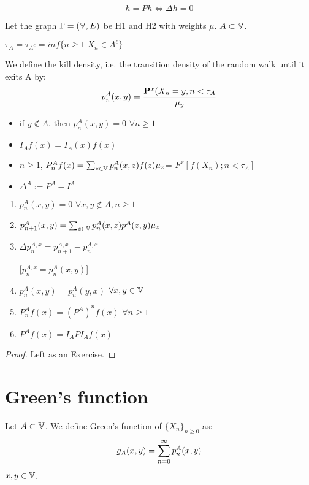 \documentclass[main]{subfiles}
\begin{document}
$$h=Ph \Leftrightarrow \Delta h=0$$

Let the graph $\Gamma=(\V,E)$ be H1 and H2 with weights $\mu$. $A \subset \V$.

$\tau_A=\tau_{A^c}=inf\{n \geq 1 | X_n \in A^c\}$

We define the kill density, i.e. the transition density of the random walk until it exits A by: $$p_n^A(x,y)=\frac{\P^x(X_n=y, n<\tau_A}{\mu_y}$$

\begin{itemize}
     \item
           if $y \notin A$, then $p_n^A(x,y)=0$ $\forall n \geq 1$
     \item
           $I_Af(x)=I_A(x)f(x)$
     \item
           $n\geq 1$, $P_n^Af(x)=\sum_{z \in \V} p_n^A(x,z)f(z)\mu_z$= $F^x[f(X_n); n<\tau_A]$
     \item
           $\Delta^A:= P^A-I^A$
\end{itemize}
\begin{lemma}
     \begin{enumerate}[label=(\alph*)]
          \item $p_n^A(x,y)=0$  $\forall x,y \notin A, n \geq 1$ \\
                \item$ p_{n+1}^A(x,y)=\sum_{z \in \V} p_n^A(x,z)p^A(z,y)\mu_z$ \\
          \item $\Delta p_n^{A,x}=p_{n+1}^{A,x}-p_n^{A,x}$

                [$p_n^{A,x}=p_n^A(x,y)$]\\
          \item $ p_n^A(x,y) = p_n^A(y,x)$ $\forall x,y \in \V$ \\
          \item $P_n^Af(x)=(P^A)^nf(x)$ $\forall n \geq 1$ \\
          \item $P^Af(x)=I_API_Af(x)$
     \end{enumerate}
\end{lemma}
\begin{proof}
     Left as an Exercise.
\end{proof}
\section{Green's function}

Let $A\subset \V$. We define Green's function of $\{X_n\}_{n\geq0}$ as:
$$g_A(x,y)= \suminf p_n^A(x,y)$$
$x,y \in \V$.
\end{document}
